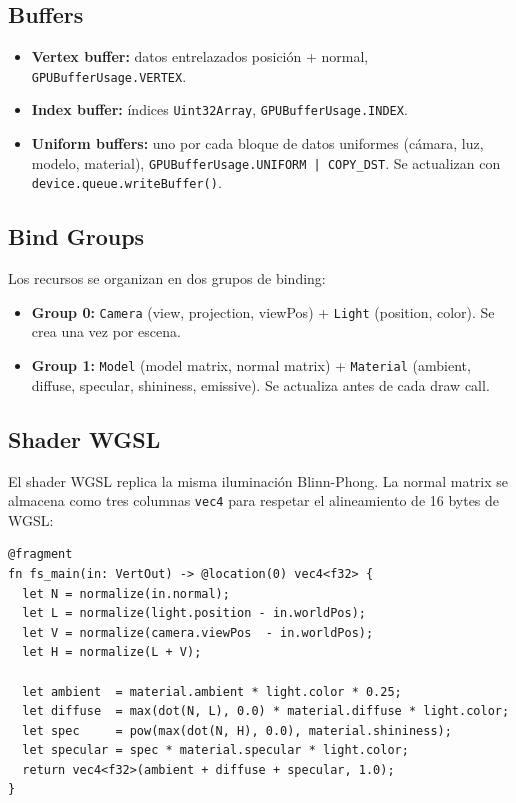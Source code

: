 \documentclass[12pt,a4paper]{article}
\begin{document}
\subsection{Buffers}

\begin{itemize}[leftmargin=*]
  \item \textbf{Vertex buffer:} datos entrelazados posición + normal, \texttt{GPUBufferUsage.VERTEX}.
  \item \textbf{Index buffer:} índices \texttt{Uint32Array}, \texttt{GPUBufferUsage.INDEX}.
  \item \textbf{Uniform buffers:} uno por cada bloque de datos uniformes (cámara, luz, modelo, material), \texttt{GPUBufferUsage.UNIFORM | COPY\_DST}. Se actualizan con \texttt{device.queue.writeBuffer()}.
\end{itemize}

\subsection{Bind Groups}

Los recursos se organizan en dos grupos de binding:

\begin{itemize}[leftmargin=*]
  \item \textbf{Group 0:} \texttt{Camera} (view, projection, viewPos) + \texttt{Light} (position, color). Se crea una vez por escena.
  \item \textbf{Group 1:} \texttt{Model} (model matrix, normal matrix) + \texttt{Material} (ambient, diffuse, specular, shininess, emissive). Se actualiza antes de cada draw call.
\end{itemize}

\subsection{Shader WGSL}

El shader WGSL replica la misma iluminación Blinn-Phong. La normal matrix se almacena como tres columnas \texttt{vec4} para respetar el alineamiento de 16 bytes de WGSL:

\begin{lstlisting}[style=glsl, language={}]
@fragment
fn fs_main(in: VertOut) -> @location(0) vec4<f32> {
  let N = normalize(in.normal);
  let L = normalize(light.position - in.worldPos);
  let V = normalize(camera.viewPos  - in.worldPos);
  let H = normalize(L + V);

  let ambient  = material.ambient * light.color * 0.25;
  let diffuse  = max(dot(N, L), 0.0) * material.diffuse * light.color;
  let spec     = pow(max(dot(N, H), 0.0), material.shininess);
  let specular = spec * material.specular * light.color;
  return vec4<f32>(ambient + diffuse + specular, 1.0);
}
\end{lstlisting}
\end{document}
